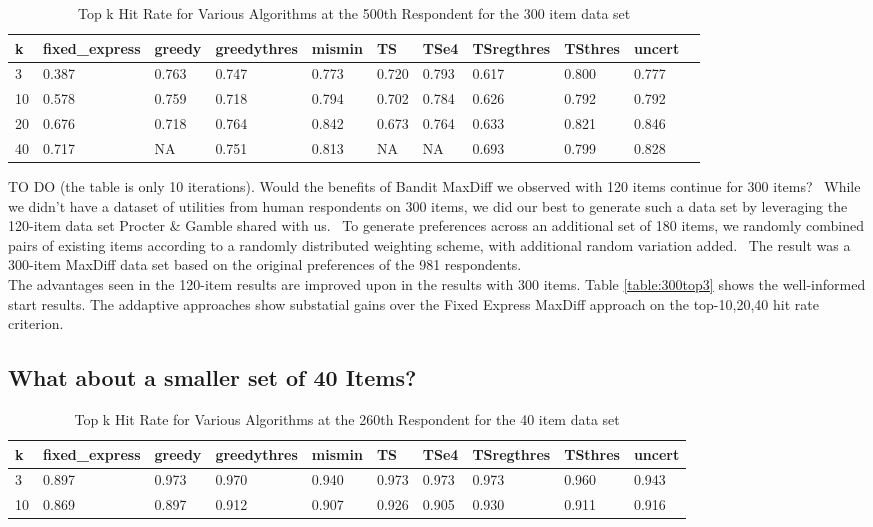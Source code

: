 \documentclass[nonblindrev]{informs3}
\begin{document}
\begin{table}
\begin{center}
\begin{tabular}{lllllllllll}
\hline   k &  fixed\_express &  greedy &  greedythres &  mismin &    TS &  TSe4 & TSregthres & TSthres &  uncert \\ \hline  3 & 0.387 &   0.763 &        0.747 &   0.773 &         0.720 & 0.793 &  0.617 &       0.800 &   0.777 \\ 10 &  0.578 &   0.759 &        0.718 &   0.794 &    0.702 & 0.784 &  0.626 &       0.792 &   0.792\\20 & 0.676 &   0.718 &        0.764 &   0.842 &     0.673 & 0.764 &     0.633 &       0.821 &    0.846 \\ 40 & 0.717 &   NA &        0.751 &   0.813 &     NA & NA &     0.693 &       0.799 &    0.828 \end{tabular}
\end{center}
\caption{Top k Hit Rate for Various Algorithms at the 500th Respondent for the 300 item data set}
\label{table:300at500}
\end{table}
TO DO (the table is only 10 iterations).
Would the benefits of Bandit MaxDiff we observed with 120 items continue for 300 items?  While we didn't have a dataset of utilities from human respondents on 300 items, we did our best to generate such a data set by leveraging the 120-item data set Procter \& Gamble shared with us.  To generate preferences across an additional set of 180 items, we randomly combined pairs of existing items according to a randomly distributed weighting scheme, with additional random variation added.  The result was a 300-item MaxDiff data set based on the original preferences of the 981 respondents.\\
The advantages seen in the 120-item results are improved upon in the results with 300 items. Table \ref{table:300top3} shows the well-informed start results. The addaptive approaches show substatial gains over the Fixed Express MaxDiff approach on the top-10,20,40 hit rate criterion.\\
\subsection{What about a smaller set of 40 Items?}
\begin{table}
\begin{center}
\begin{tabular}{llllllllll}
\hline   k &  fixed\_express &  greedy &  greedythres &  mismin &    TS &  TSe4 &  TSregthres &  TSthres &  uncert  \\ \hline    3 &          0.897 &   0.973 &        0.970 &   0.940 & 0.973 & 0.973 &       0.973 &    0.960 &   0.943 \\  10 &          0.869 &   0.897 &        0.912 &   0.907 & 0.926 & 0.905 &       0.930 &    0.911 &   0.916  \end{tabular}
\end{center}
\caption{Top k Hit Rate for Various Algorithms at the 260th Respondent for the 40 item data set}
\label{table:40at260}
\end{table}
\end{document}
